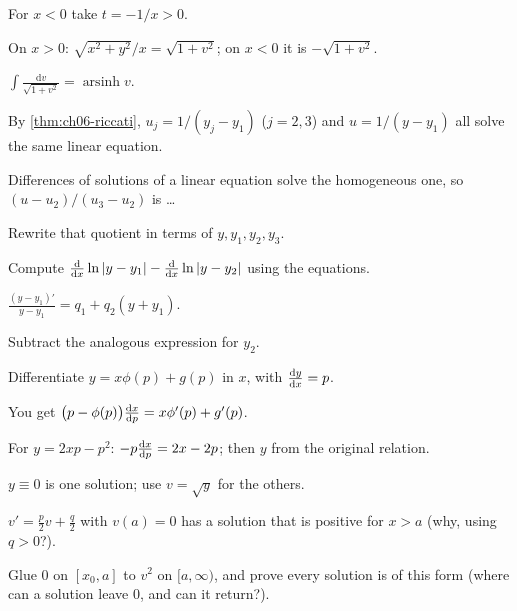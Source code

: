 \begin{hintlevels}
  \item For $x<0$ take $t = -1/x>0$.
  \item On $x>0$: $\sqrt{x^2+y^2}/x = \sqrt{1+v^2}$; on $x<0$ it is
        $-\sqrt{1+v^2}$.
  \item $\int\frac{\mathrm{d}v}{\sqrt{1+v^2}} = \operatorname{arsinh}v$.
\end{hintlevels}

\begin{hintlevels}
  \item By \cref{thm:ch06-riccati}, $u_j = 1/(y_j - y_1)$ ($j = 2,3$) and
        $u = 1/(y - y_1)$ all solve the same linear equation.
  \item Differences of solutions of a linear equation solve the homogeneous one,
        so $(u - u_2)/(u_3 - u_2)$ is \ldots
  \item Rewrite that quotient in terms of $y, y_1, y_2, y_3$.
\end{hintlevels}

\begin{hintlevels}
  \item Compute $\frac{\mathrm{d}}{\mathrm{d}x}\ln|y - y_1| - \frac{\mathrm{d}}{\mathrm{d}x}\ln|y - y_2|$ using the
        equations.
  \item $\frac{(y-y_1)'}{y - y_1} = q_1 + q_2(y + y_1)$.
  \item Subtract the analogous expression for $y_2$.
\end{hintlevels}

\begin{hintlevels}
  \item Differentiate $y = x\phi(p) + g(p)$ in $x$, with $\frac{\mathrm{d}y}{\mathrm{d}x} = p$.
  \item You get $\bigl(p - \phi(p)\bigr)\frac{\mathrm{d}x}{\mathrm{d}p} = x\phi'(p) + g'(p)$.
  \item For $y = 2xp - p^2$: $-p\frac{\mathrm{d}x}{\mathrm{d}p} = 2x - 2p$; then $y$ from the original
        relation.
\end{hintlevels}

\begin{hintlevels}
  \item $y\equiv0$ is one solution; use $v = \sqrt y$ for the others.
  \item $v' = \frac p2 v + \frac q2$ with $v(a) = 0$ has a solution that is
        positive for $x>a$ (why, using $q>0$?).
  \item Glue $0$ on $[x_0,a]$ to $v^2$ on $[a,\infty)$, and prove every solution
        is of this form (where can a solution leave $0$, and can it return?).
\end{hintlevels}

